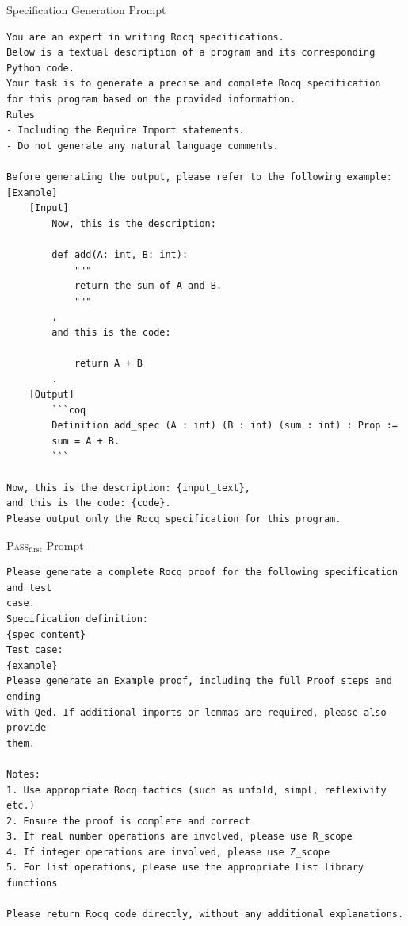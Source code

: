 \begin{promptbox}{Specification Generation Prompt}
\begin{verbatim}
You are an expert in writing Rocq specifications.
Below is a textual description of a program and its corresponding Python code.
Your task is to generate a precise and complete Rocq specification 
for this program based on the provided information.
Rules
- Including the Require Import statements.
- Do not generate any natural language comments.

Before generating the output, please refer to the following example:
[Example]
    [Input]
        Now, this is the description: 

        def add(A: int, B: int):
            """
            return the sum of A and B.
            """
        ,
        and this is the code: 

            return A + B
        .
    [Output]
        ```coq
        Definition add_spec (A : int) (B : int) (sum : int) : Prop :=
        sum = A + B.
        ```

Now, this is the description: {input_text},
and this is the code: {code}.
Please output only the Rocq specification for this program.
\end{verbatim}
\end{promptbox}

\clearpage
\begin{promptbox}{\textsc{Pass}$_{\text{first}}$ Prompt}
\begin{verbatim}
Please generate a complete Rocq proof for the following specification and test
case.
Specification definition:
{spec_content}
Test case:
{example}
Please generate an Example proof, including the full Proof steps and ending 
with Qed. If additional imports or lemmas are required, please also provide 
them.

Notes:
1. Use appropriate Rocq tactics (such as unfold, simpl, reflexivity etc.)
2. Ensure the proof is complete and correct
3. If real number operations are involved, please use R_scope
4. If integer operations are involved, please use Z_scope
5. For list operations, please use the appropriate List library functions

Please return Rocq code directly, without any additional explanations.
\end{verbatim}
\end{promptbox}

